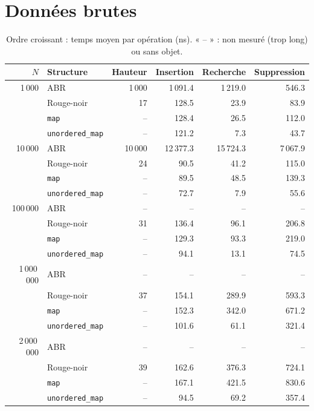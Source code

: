 \documentclass[12pt,a4paper]{report}
\newcommand{\bad}{\cellcolor{ko}}
\begin{document}
\section{Données brutes}
\begin{table}[H]
\centering
\caption{Ordre croissant : temps moyen par opération (ns). « -- » : non mesuré (trop long) ou sans objet.}
\small
\begin{tabular}{rlrrrr}
  \toprule
  $N$ & Structure & Hauteur & Insertion & Recherche & Suppression \\
  \midrule
  1\,000 & ABR & \bad 1\,000 & \bad 1\,091.4 & \bad 1\,219.0 & \bad 546.3 \\
         & Rouge-noir & 17 & 128.5 & 23.9 & 83.9 \\
         & \texttt{map} & -- & 128.4 & 26.5 & 112.0 \\
         & \texttt{unordered\_map} & -- & 121.2 & 7.3 & 43.7 \\
  \midrule
  10\,000 & ABR & \bad 10\,000 & \bad 12\,377.3 & \bad 15\,724.3 & \bad 7\,067.9 \\
          & Rouge-noir & 24 & 90.5 & 41.2 & 115.0 \\
          & \texttt{map} & -- & 89.5 & 48.5 & 139.3 \\
          & \texttt{unordered\_map} & -- & 72.7 & 7.9 & 55.6 \\
  \midrule
  100\,000 & ABR & -- & -- & -- & -- \\
           & Rouge-noir & 31 & 136.4 & 96.1 & 206.8 \\
           & \texttt{map} & -- & 129.3 & 93.3 & 219.0 \\
           & \texttt{unordered\_map} & -- & 94.1 & 13.1 & 74.5 \\
  \midrule
  1\,000\,000 & ABR & -- & -- & -- & -- \\
              & Rouge-noir & 37 & 154.1 & 289.9 & 593.3 \\
              & \texttt{map} & -- & 152.3 & 342.0 & 671.2 \\
              & \texttt{unordered\_map} & -- & 101.6 & 61.1 & 321.4 \\
  \midrule
  2\,000\,000 & ABR & -- & -- & -- & -- \\
              & Rouge-noir & 39 & 162.6 & 376.3 & 724.1 \\
              & \texttt{map} & -- & 167.1 & 421.5 & 830.6 \\
              & \texttt{unordered\_map} & -- & 94.5 & 69.2 & 357.4 \\
  \bottomrule
\end{tabular}
\end{table}
\end{document}
